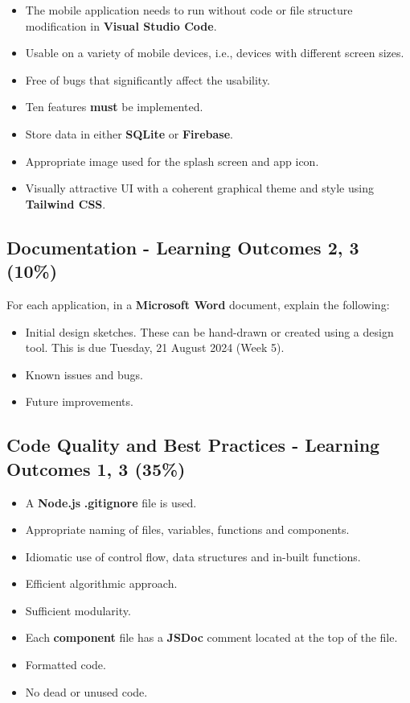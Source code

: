 \documentclass{article}
\begin{document}
\begin{itemize}
  \begin{itemize}
    \item The mobile application needs to run without code or file structure modification in \textbf{Visual Studio Code}.
    \item Usable on a variety of mobile devices, i.e., devices with different screen sizes.
    \item Free of bugs that significantly affect the usability.
    \item Ten features \textbf{must} be implemented.
    \item Store data in either \textbf{SQLite} or \textbf{Firebase}. 
    \item Appropriate image used for the splash screen and app icon.
    \item Visually attractive UI with a coherent graphical theme and style using \textbf{Tailwind CSS}.
  \end{itemize}
\end{itemize}

\subsection*{Documentation - Learning Outcomes 2, 3 (10\%)}
For each application, in a \textbf{Microsoft Word} document, explain the following:
\begin{itemize}
  \item Initial design sketches. These can be hand-drawn or created using a design tool. This is due Tuesday, 21 August 2024 (Week 5).
  \item Known issues and bugs.
  \item Future improvements.
\end{itemize}

\subsection*{Code Quality and Best Practices - Learning Outcomes 1, 3 (35\%)}
\begin{itemize}
  \item A \textbf{Node.js} \textbf{.gitignore} file is used.
  \item Appropriate naming of files, variables, functions and components.
  \item Idiomatic use of control flow, data structures and in-built functions.
  \item Efficient algorithmic approach.
  \item Sufficient modularity.
  \item Each \textbf{component} file has a \textbf{JSDoc} comment located at the top of the file.
  \item Formatted code.
  \item No dead or unused code. 
\end{itemize}
\end{document}
